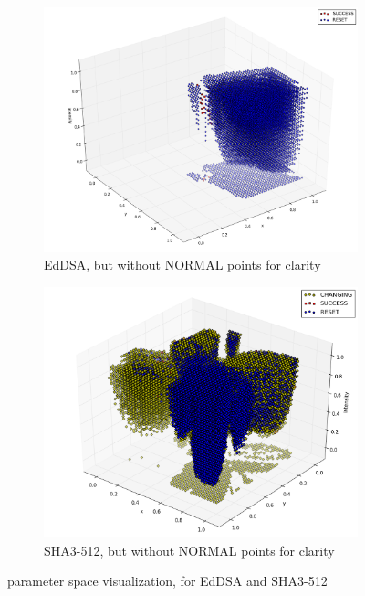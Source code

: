 \documentclass[times, utf8, diplomski]{fer}
\begin{document}
\begin{figure}[htbp]
    \begin{subfigure}[b]{0.48\textwidth}
        \includegraphics[width=0.95\linewidth]{images/plots/EdDSA_space_nonormal_3D.png}
        \caption{EdDSA, but without NORMAL points for clarity}
    \end{subfigure}
    \hspace{8pt}
    \begin{subfigure}[b]{0.48\textwidth}
        \includegraphics[width=0.95\linewidth]{images/plots/Keccak_space_nonormal_3D.png}
        \caption{SHA3-512, but without NORMAL points for clarity}
    \end{subfigure}

    \caption{parameter space visualization, for EdDSA and SHA3-512}
    \label{fig:parameter_spaces}
\end{figure}
\end{document}
